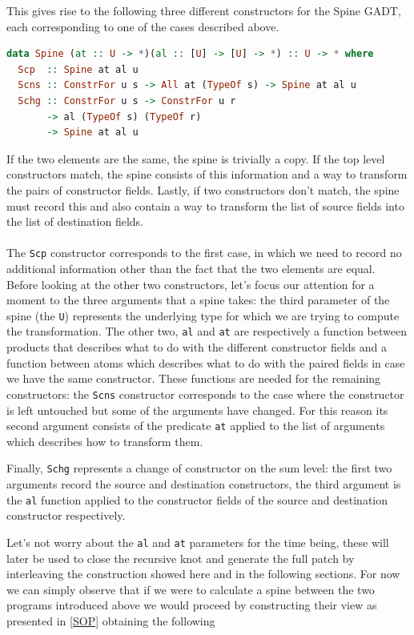 \documentclass[11pt]{article}
\begin{document}
This gives rise
to the following three different constructors for the Spine GADT, each
corresponding to one of the cases described above.

\begin{lstlisting}[language=haskell]
data Spine (at :: U -> *)(al :: [U] -> [U] -> *) :: U -> * where
  Scp  :: Spine at al u
  Scns :: ConstrFor u s -> All at (TypeOf s) -> Spine at al u
  Schg :: ConstrFor u s -> ConstrFor u r
       -> al (TypeOf s) (TypeOf r)
       -> Spine at al u
\end{lstlisting}

If the two
elements are the same, the spine is trivially a copy. If the top level
constructors match, the spine consists of this information and a way to
transform the pairs of constructor fields. Lastly, if two constructors
don't match, the spine must record this and also contain a way to
transform the list of source fields into the list of destination fields.
\\\\
The \texttt{Scp} constructor corresponds to the first case, in which we need
to record no additional information other than the fact that the two
elements are equal. 
Before looking at the other two constructors, let's focus our attention for a moment to the three arguments that a spine takes:
the third parameter of the spine (the \texttt{U}) represents the
underlying type for which we are trying to compute the transformation.
The other two, \texttt{al} and \texttt{at} are respectively a
function between products that describes what to do with the different
constructor fields and a function between atoms which describes what to
do with the paired fields in case we have the same constructor.
These functions are needed for the remaining constructors: the \texttt{Scns} constructor corresponds to the 
case where the constructor is left untouched but some of the arguments have changed.
For this reason its second argument consists of the predicate \texttt{at} applied to the list of arguments which describes
how to transform them. 

Finally, \texttt{Schg} represents a change of constructor on the sum level: the first two arguments record the
source and destination constructors, the third argument is the
\texttt{al} function applied to the constructor fields of the source and
destination constructor respectively.

Let's not worry about the \texttt{al} and \texttt{at} parameters for the time 
being, these will later be used to close the recursive knot and generate the full patch by interleaving
the construction showed here and in the following sections. 
For now we can simply observe that if we were to calculate a spine between the 
two programs introduced above we would proceed by constructing their view as 
presented in \ref{SOP} obtaining the following
\end{document}
